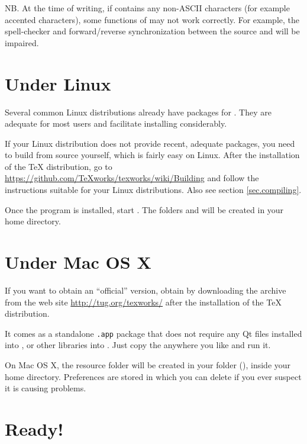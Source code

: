 NB. At the time of writing, if  contains any non-ASCII characters (for example accented characters), some functions of {\Tw} may not work correctly. For example, the spell-checker and forward/reverse synchronization between the source and  will be impaired.

\section{Under Linux}

Several common Linux distributions already have packages for {\Tw}. They are adequate for most users and facilitate installing {\Tw} considerably.

If your Linux distribution does not provide recent, adequate packages, you need to build {\Tw} from source yourself, which is fairly easy on Linux. After the installation of the {\TeX} distribution, go to \url{https://github.com/TeXworks/texworks/wiki/Building} and follow the instructions suitable for your Linux distributions. Also see section \ref{sec.compiling}.

Once the program is installed, start {\Tw}. The folders  and  will be created in your home directory.

\section{Under Mac OS X}

If you want to obtain an ``official'' version, obtain {\Tw} by downloading the archive from the {\Tw} web site \url{http://tug.org/texworks/} after the installation of the {\TeX} distribution.

It comes as a standalone \texttt{.app} package that does not require any Qt files installed into , or other libraries into . Just copy the  anywhere you like and run it.

On Mac OS X, the {\Tw} resource folder will be created in your  folder (), inside your home directory. Preferences are stored in 
which you can delete if you ever suspect it is causing problems.

\section{Ready!}

